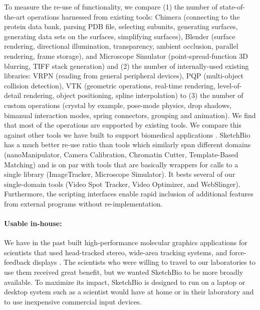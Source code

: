 \documentclass[twocolumn]{bmcart}%
\begin{document}
To measure the re-use of functionality, we compare (1) the number of state-of-the-art operations harnessed from existing tools: Chimera (connecting to the protein data bank, parsing PDB file, selecting subunits, generating surfaces, generating data sets on the surfaces, simplifying surfaces), Blender (surface rendering, directional illumination, transparency, ambient occlusion, parallel rendering, frame storage), and Microscope Simulator (point-spread-function 3D blurring, TIFF stack generation) and (2) the number of internally-used existing libraries: VRPN (reading from general peripheral devices), PQP (multi-object collision detection), VTK (geometric operations, real-time rendering, level-of-detail rendering, object positioning, spline interpolation) to (3) the number of custom operations (crystal by example, pose-mode physics, drop shadows, bimanual interaction modes, spring connectors, grouping and animation).  We find that most of the operations are supported by existing tools.
We compare this against other tools we have built to support biomedical applications \cite{CISMMapps}. SketchBio has a much better re-use ratio than tools which similarly span different domains (nanoManipulator, Camera Calibration, Chromatin Cutter, Template-Based Matching) and is on par with tools that are basically wrappers for calls to a single library (ImageTracker, Microscope Simulator).  It bests several of our single-domain tools (Video Spot Tracker, Video Optimizer, and WebSlinger).
Furthermore, the scripting interfaces enable rapid inclusion of additional features from external programs without re-implementation.

\paragraph*{Usable in-house:} We have in the past built high-performance molecular graphics applications for scientists that used head-tracked stereo, wide-area tracking systems, and force-feedback displays \cite{Arthur,Grant1998,Marshburn2005,Taylor1999,Taylor1997,Taylor1993}.
The scientists who were willing to travel to our laboratories to use them received great benefit, but we wanted SketchBio to be more broadly available.
To maximize its impact, SketchBio is designed to run on a laptop or desktop system such as a scientist would have at home or in their laboratory and to use inexpensive commercial input devices.
\end{document}
